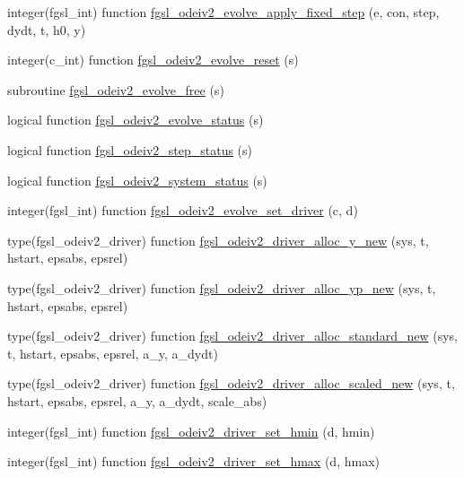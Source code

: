 \begin{DoxyCompactItemize}
\item 
integer(fgsl\+\_\+int) function \hyperlink{ode_8finc_a784c0214cbb688d0fcb954ba3c868bb8}{fgsl\+\_\+odeiv2\+\_\+evolve\+\_\+apply\+\_\+fixed\+\_\+step} (e, con, step, dydt, t, h0, y)
\item 
integer(c\+\_\+int) function \hyperlink{ode_8finc_a58db655eeefa6587785e3681fe1f1fe3}{fgsl\+\_\+odeiv2\+\_\+evolve\+\_\+reset} (s)
\item 
subroutine \hyperlink{ode_8finc_ae420fff7079d79241900c38192a15b18}{fgsl\+\_\+odeiv2\+\_\+evolve\+\_\+free} (s)
\item 
logical function \hyperlink{ode_8finc_a903a7d2d07429f4d1ce0291ed0a29cf6}{fgsl\+\_\+odeiv2\+\_\+evolve\+\_\+status} (s)
\item 
logical function \hyperlink{ode_8finc_aae3c317f1477f7e8896ed8fa1a50a5ef}{fgsl\+\_\+odeiv2\+\_\+step\+\_\+status} (s)
\item 
logical function \hyperlink{ode_8finc_acedda44a6ed7e98748b97edc43597fbf}{fgsl\+\_\+odeiv2\+\_\+system\+\_\+status} (s)
\item 
integer(fgsl\+\_\+int) function \hyperlink{ode_8finc_a3a068def5f64087448b8b725b56f0f44}{fgsl\+\_\+odeiv2\+\_\+evolve\+\_\+set\+\_\+driver} (c, d)
\item 
type(fgsl\+\_\+odeiv2\+\_\+driver) function \hyperlink{ode_8finc_abb00c1c5c177a7c9a456b02f34a4a9b4}{fgsl\+\_\+odeiv2\+\_\+driver\+\_\+alloc\+\_\+y\+\_\+new} (sys, t, hstart, epsabs, epsrel)
\item 
type(fgsl\+\_\+odeiv2\+\_\+driver) function \hyperlink{ode_8finc_a178c0c3dd596ef26f99e99825d4586d7}{fgsl\+\_\+odeiv2\+\_\+driver\+\_\+alloc\+\_\+yp\+\_\+new} (sys, t, hstart, epsabs, epsrel)
\item 
type(fgsl\+\_\+odeiv2\+\_\+driver) function \hyperlink{ode_8finc_a06a42be695134e3e8301b7148e7ce838}{fgsl\+\_\+odeiv2\+\_\+driver\+\_\+alloc\+\_\+standard\+\_\+new} (sys, t, hstart, epsabs, epsrel, a\+\_\+y, a\+\_\+dydt)
\item 
type(fgsl\+\_\+odeiv2\+\_\+driver) function \hyperlink{ode_8finc_a37b762b00ed8cc4614a5290998dd0be7}{fgsl\+\_\+odeiv2\+\_\+driver\+\_\+alloc\+\_\+scaled\+\_\+new} (sys, t, hstart, epsabs, epsrel, a\+\_\+y, a\+\_\+dydt, scale\+\_\+abs)
\item 
integer(fgsl\+\_\+int) function \hyperlink{ode_8finc_a1a52468942b08b4fc33a09404492b67e}{fgsl\+\_\+odeiv2\+\_\+driver\+\_\+set\+\_\+hmin} (d, hmin)
\item 
integer(fgsl\+\_\+int) function \hyperlink{ode_8finc_a524a858cffa85f419e05e2da0a21f813}{fgsl\+\_\+odeiv2\+\_\+driver\+\_\+set\+\_\+hmax} (d, hmax)

\end{DoxyCompactItemize}

